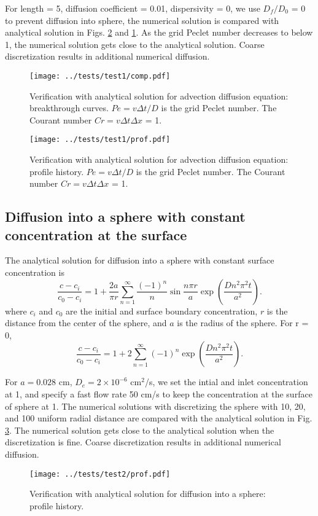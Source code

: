 \documentclass{article}
\begin{document}
For length = 5, diffusion coefficient = 0.01, dispersivity = 0, we use $D_f/D_0$ = 0 to prevent diffusion into sphere, the numerical solution is compared with analytical solution in Figs. \ref{fig:test1prof} and \ref{fig:test1comp}. As the grid Peclet number decreases to below 1, the numerical solution gets close to the analytical solution. Coarse discretization results in additional numerical diffusion.

\begin{figure}[htb]
\centerline{\texttt{[image: ../tests/test1/comp.pdf]}}
\caption{Verification with analytical solution for advection diffusion equation: breakthrough curves. $Pe = v\Delta t/D$ is the grid Peclet number. The Courant number $Cr = v\Delta t\Delta x$ = 1.}
\label{fig:test1comp}
\end{figure}

\begin{figure}[htb]
\centerline{\texttt{[image: ../tests/test1/prof.pdf]}}
\caption{Verification with analytical solution for advection diffusion equation: profile history. $Pe = v\Delta t/D$ is the grid Peclet number. The Courant number $Cr = v\Delta t\Delta x$ = 1.}
\label{fig:test1prof}
\end{figure}

\subsection{Diffusion into a sphere with constant concentration at the surface}
The analytical solution for diffusion into a sphere with constant surface concentration is \cite{Crank1975} 
\begin{equation}
\frac{c-c_i}{c_0-c_i} = 1 + \frac{2a}{\pi r} \sum_{n=1}^\infty \frac{(-1)^n}{n} \sin\frac{n\pi r}{a}\exp\left(\frac{Dn^2\pi^2t}{a^2}\right).
\end{equation}
where $c_i$ and $c_0$ are the initial and surface boundary concentration, $r$ is the distance from the center of the sphere, and $a$ is the radius of the sphere. For r = 0, 
\begin{equation}
\frac{c-c_i}{c_0-c_i} = 1 + 2 \sum_{n=1}^\infty (-1)^n \exp\left(\frac{Dn^2\pi^2t}{a^2}\right).
\end{equation}

For $a = 0.028$ cm, $D_e = 2\times 10^{-6}$ cm$^2$/s, we set the intial and inlet concentration at 1, and specify a fast flow rate 50 cm/s to keep the concentration at the surface of sphere at 1. The numerical solutions with discretizing the sphere with 10, 20, and 100 uniform radial distance are compared with the analytical solution in Fig. \ref{fig:test2prof}. The numerical solution gets close to the analytical solution when the discretization is fine. Coarse discretization results in additional numerical diffusion. 

\begin{figure}[htb]
\centerline{\texttt{[image: ../tests/test2/prof.pdf]}}
\caption{Verification with analytical solution for diffusion into a sphere: profile history.}
\label{fig:test2prof}
\end{figure}


{}

\end{document}
